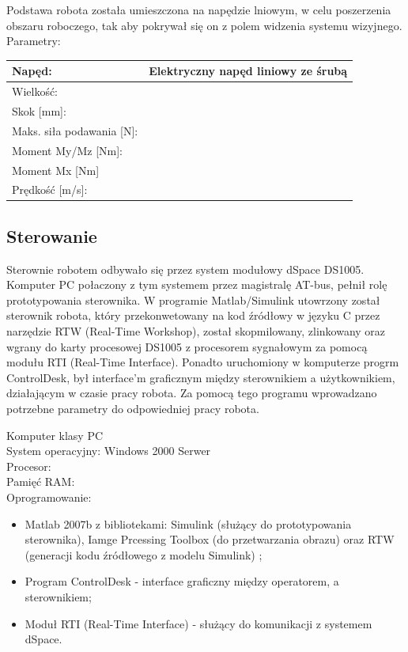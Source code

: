 \vspace{5mm}

Podstawa robota została umieszczona na napędzie lniowym, w celu poszerzenia obszaru roboczego, tak aby pokrywał się on z polem widzenia systemu wizyjnego.\\
Parametry:\\
\begin{tabular}{|l|l|}\hline
Napęd: & Elektryczny napęd liniowy ze śrubą \\ \hline
Wielkość: & \\ \hline
Skok [mm]: & \\ \hline
Maks. siła podawania [N]: & \\ \hline
Moment My/Mz [Nm]: & \\ \hline
Moment Mx [Nm] & \\ \hline
Prędkość [m/s]: & \\ \hline
\end{tabular}
\subsection{Sterowanie}
Sterownie robotem odbywało się przez system modułowy dSpace DS1005. Komputer PC połaczony z tym systemem przez magistralę AT-bus, pełnił rolę prototypowania sterownika. W programie Matlab/Simulink utowrzony został sterownik robota, który przekonwetowany na kod źródłowy w języku C przez narzędzie RTW (Real-Time Workshop), został skopmilowany, zlinkowany oraz wgrany do karty procesowej DS1005 z procesorem sygnałowym za pomocą modułu RTI (Real-Time Interface). Ponadto uruchomiony w komputerze progrm ControlDesk, był interface'm graficznym  między sterownikiem a użytkownikiem, działającym w czasie pracy robota. Za pomocą tego programu wprowadzano potrzebne parametry do odpowiedniej pracy robota.


\noindent 
Komputer klasy PC\\
System operacyjny: Windows 2000 Serwer\\
Procesor:\\
Pamięć RAM:\\

\noindent Oprogramowanie:
\begin{itemize}
\item Matlab 2007b z bibliotekami: Simulink (służący do prototypowania sterownika), Iamge Prcessing Toolbox (do przetwarzania obrazu) oraz RTW (generacji kodu źródłowego z modelu Simulink) ;
\item Program ControlDesk - interface graficzny między operatorem, a sterownikiem;
\item Moduł RTI (Real-Time Interface) - służący do komunikacji z systemem dSpace.
\end{itemize}

